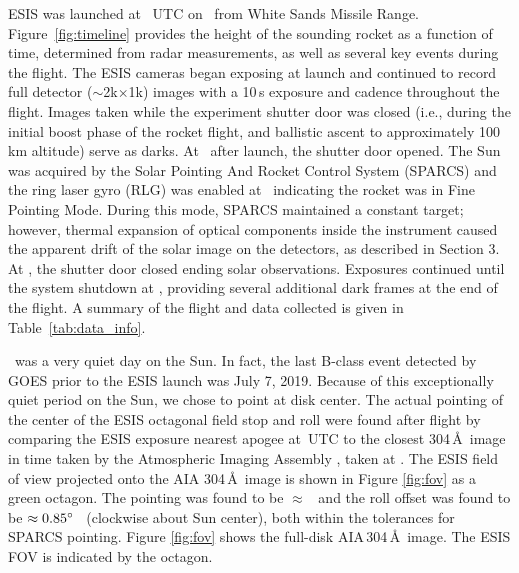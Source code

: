 		ESIS was launched at \timeMissionStart~UTC
		on \dateMission\ from White Sands Missile Range.  Figure~\ref{fig:timeline} provides the height of the sounding rocket as a function of time, determined from %
		radar measurements, as well as several key events during the flight.  
		The ESIS cameras began exposing at launch and continued to record full detector ($\sim$2k$\times$1k) images with a 10\,s exposure and cadence throughout the flight. Images taken while the
		experiment shutter door was closed (i.e., during the initial  boost phase of the rocket flight, and ballistic ascent to approximately 100\,km altitude) serve as darks.  
		At \timeMissionShutterOpen\ after launch, the shutter door %
		opened.  
		The Sun was acquired by the Solar Pointing And Rocket %
		Control System (SPARCS) and the ring laser gyro (RLG) was enabled at \timeMissionRlgEnable\ indicating the rocket was in Fine Pointing Mode.  
		During this mode, SPARCS maintained a constant target; however, thermal expansion of optical components inside the instrument caused the apparent drift of the solar image on the detectors, as described in Section 3.  
		At  \timeMissionShutterClose, the shutter door closed ending solar observations. Exposures continued until the system shutdown at \timeDataStop, providing several additional dark frames at the end of the flight.   A summary of the flight and data collected is given in Table~\ref{tab:data_info}.
		
	    \dateMission\ was a very quiet day on the Sun.  
	    In fact, the last  B-class event detected by GOES \citep{GOES} prior to the ESIS launch was July 7, 2019.  Because of this exceptionally quiet period on the Sun, we chose to point at disk center. 
	    The actual pointing of the center of the ESIS octagonal field stop and roll were found after flight by comparing the ESIS exposure nearest apogee at \timeApogeeFrame\,UTC to the closest 304\,\AA \ image in time taken by the Atmospheric Imaging Assembly \citep[AIA][]{Lemen2012}, taken at \aianearapogee.  
	    The ESIS field of view projected onto the AIA 304\,\AA\ image is shown in Figure \ref{fig:fov} as a green octagon.  
	    The pointing was found to be $\approx$ \esispointing \ and the roll offset was found to be $\approx 0.85^{\circ}$ \ (clockwise about Sun center), both within the tolerances for SPARCS pointing.  
	    Figure \ref{fig:fov} shows the full-disk AIA\,304\,\AA\ image. 
	    The ESIS FOV is indicated by the octagon.  
	    
